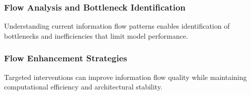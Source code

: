 \subsubsection{Flow Analysis and Bottleneck Identification}

Understanding current information flow patterns enables identification of bottlenecks and inefficiencies that limit model performance.

\subsubsection{Flow Enhancement Strategies}

Targeted interventions can improve information flow quality while maintaining computational efficiency and architectural stability.